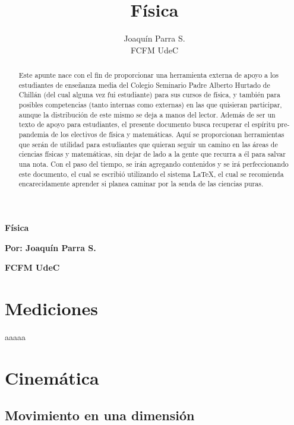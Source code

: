 \documentclass[12pt]{article}
\title{\textbf{F\'isica}}
\author{Joaqu\'in Parra S. \\ FCFM UdeC}
\begin{document}
\begin{center}
 {\Huge \textbf{F\'isica\\}}%
		        \vspace*{1.5\baselineskip}

		\large{\textbf{Por: Joaqu\'in Parra S.}}\\ %
		
        \vspace*{1,5\baselineskip}

		\large{\textbf{FCFM UdeC}}\\ %
		
		\vspace{1,5\baselineskip}
		
\end{center}
\large{
\begin{abstract}
 Este apunte nace con el fin de proporcionar una herramienta externa de apoyo a los estudiantes de ense\~{n}anza media del Colegio 
 Seminario Padre Alberto Hurtado de Chill\'an (del cual alguna vez fui estudiante) para sus cursos de f\'isica, y tambi\'en para posibles
 competencias (tanto internas como externas) en las que quisieran participar, aunque la distribuci\'on de este mismo se deja a manos del lector.
 Adem\'as de ser un texto de apoyo para estudiantes, el presente documento busca recuperar el espíritu pre-pandemia de los electivos de f\'isica 
 y matem\'aticas. Aqu\'i se proporcionan herramientas que ser\'an de utilidad para estudiantes que quieran seguir un camino en las \'areas de 
 ciencias f\'isicas y matem\'aticas, sin dejar de lado a la gente que recurra a \'el para salvar una nota.
 Con el paso del tiempo, se ir\'an agregando contenidos y se ir\'a perfeccionando este documento, el cual se escribi\'o utilizando el sistema
 {\LaTeX}, el cual se recomienda encarecidamente aprender si planea caminar por la senda de las ciencias puras.
\end{abstract}
}
\newpage
\tableofcontents
\section{Mediciones}
aaaaa

\section{Cinemática}
 \subsection{Movimiento en una dimensi\'on}
\end{document}

